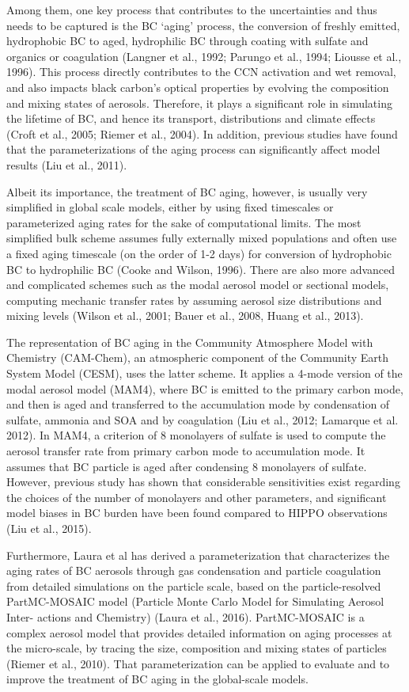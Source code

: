 \documentclass[12pt]{article}
\begin{document}
	Among them, one key process that contributes to the uncertainties and thus needs to be captured is the BC ‘aging’ process, the conversion of freshly emitted, hydrophobic BC to aged, hydrophilic BC through coating with sulfate and organics or coagulation (Langner et al., 1992; Parungo et al., 1994; Liousse et al., 1996). This process directly contributes to the CCN activation and wet removal, and also impacts black carbon’s optical properties by evolving the composition and mixing states of aerosols. Therefore, it plays a significant role in simulating the lifetime of BC, and hence its transport, distributions and climate effects (Croft et al., 2005; Riemer et al., 2004). In addition, previous studies have found that the parameterizations of the aging process can significantly affect model results (Liu et al., 2011).

	Albeit its importance, the treatment of BC aging, however, is usually very simplified in global scale models, either by using fixed timescales or parameterized aging rates for the sake of computational limits. The most simplified bulk scheme assumes fully externally mixed populations and often use a fixed aging timescale (on the order of 1-2 days) for conversion of hydrophobic BC to hydrophilic BC (Cooke and Wilson, 1996). There are also more advanced and complicated schemes such as the modal aerosol model or sectional models, computing mechanic transfer rates by assuming aerosol size distributions and mixing levels (Wilson et al., 2001; Bauer et al., 2008, Huang et al., 2013). 

	The representation of BC aging in the Community Atmosphere Model with Chemistry (CAM-Chem), an atmospheric component of the Community Earth System Model (CESM), uses the latter scheme. It applies a 4-mode version of the modal aerosol model (MAM4), where BC is emitted to the primary carbon mode, and then is aged and transferred to the accumulation mode by condensation of sulfate, ammonia and SOA and by coagulation (Liu et al., 2012; Lamarque et al. 2012). In MAM4, a criterion of 8 monolayers of sulfate is used to compute the aerosol transfer rate from primary carbon mode to accumulation mode. It assumes that BC particle is aged after condensing 8 monolayers of sulfate. However, previous study has shown that considerable sensitivities exist regarding the choices of the number of monolayers and other parameters, and significant model biases in BC burden have been found compared to HIPPO observations (Liu et al., 2015). 

	Furthermore, Laura et al has derived a parameterization that characterizes the aging rates of BC aerosols through gas condensation and particle coagulation from detailed simulations on the particle scale, based on the particle-resolved PartMC-MOSAIC model (Particle Monte Carlo Model for Simulating Aerosol Inter- actions and Chemistry) (Laura et al., 2016). PartMC-MOSAIC is a complex aerosol model that provides detailed information on aging processes at the micro-scale, by tracing the size, composition and mixing states of particles (Riemer et al., 2010). That parameterization can be applied to evaluate and to improve the treatment of BC aging in the global-scale models. 
\end{document}
